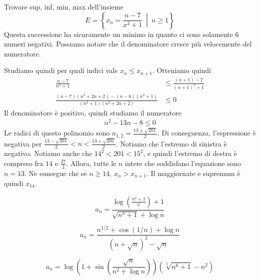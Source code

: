 \documentclass[a4paper]{article}
\begin{document}
\begin{snippetexercise}{}
    Trovare sup, inf, min, max dell'insieme
    \[
        E = \left\{ x_n = \frac{n-7}{x^2 + 1} \ \middle|\ n \geq 1 \right\}
    \]
    Questa successione ha sicuramente un minimo in quanto ci sono solamente \(6\) numeri negativi.
    Possiamo notare che il denominatore cresce più velocemente del numeratore.

    Studiamo quindi per quali indici vale \(x_n \leq x_{n+1}\). Otteniamo quindi
    \begin{align*}
        \frac{n-7}{n^2 + 1} &\leq \frac{(n+1)-7}{{(n+1)}^2 + 1} \\
        \frac{(n-7)(n^2 + 2n + 2) - (n-6)(n^2+1)}{(n^2 + 1)(n^2 + 2n + 2)} &\leq 0
    \end{align*}
    Il denominatore è positivo, quindi studiamo il numeratore
    \begin{align*}
        n^2 - 13n - 8 \leq 0
    \end{align*}
    Le radici di questo polinomio sono \(n_{1,2}= \frac{13\pm\sqrt{201}}{2}\).
    Di conseguenza, l'espressione è negativa per \(\frac{13-\sqrt{201}}{2} < n < \frac{13+\sqrt{201}}{2}\).
    Notiamo che l'estremo di sinistra è negativo. Notiamo anche che \(14^2 < 201 < 15^2\),
    e quindi l'estremo di destra è compreso fra \(14\) e \(\frac{27}{2}\).
    Allora, tutte le \(n\) intere che soddisfano l'equazione sono
    \(n=13\). Ne consegue che se \(n \geq 14\), \(x_n > x_{n+1}\).
    Il maggiornate e supremum è quindi \(x_{14}\).
\end{snippetexercise}


\begin{snippetexercise}{}
    \[
        a_n = \frac{
            \log \left(\frac{n^2 + 1}{n}\right) + 1
        }{
            \sqrt{n^3 + 1} + \log n
        }
    \]
\end{snippetexercise}

\begin{snippetexercise}{}
    \[
        a_n = \frac{
            n^{1/2} + \cos(1/n) + \log n
        }{
            {(n + \sqrt{n})}^2 - \sqrt{n}
        }
    \]
\end{snippetexercise}

\begin{snippetexercise}{}
    \[
        a_n = \log \left(
            1 + \sin \left(\frac{\sqrt{n}}{n^2 + \log n}\right)
        \right)
        \left(\sqrt[3]{n^6 + 1} - n^2\right)
    \]
\end{snippetexercise}
\end{document}
